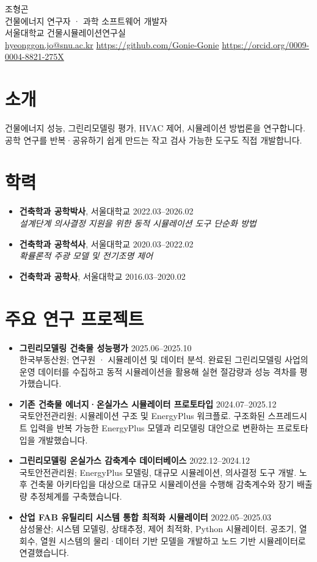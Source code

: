 \documentclass[10pt,a4paper]{article}
\begin{document}
{\LARGE 조형곤}\\[3pt]
건물에너지 연구자 · 과학 소프트웨어 개발자\\
서울대학교 건물시뮬레이션연구실\\
\href{mailto:hyeonggon.jo@snu.ac.kr}{hyeonggon.jo@snu.ac.kr} \quad \url{https://github.com/Gonie-Gonie} \quad \url{https://orcid.org/0009-0004-8821-275X}

\section*{소개}
건물에너지 성능, 그린리모델링 평가, HVAC 제어, 시뮬레이션 방법론을 연구합니다. 공학 연구를 반복·공유하기 쉽게 만드는 작고 검사 가능한 도구도 직접 개발합니다.

\section*{학력}
\begin{itemize}[leftmargin=*,nosep]
\item \textbf{건축학과 공학박사}, 서울대학교 \hfill 2022.03–2026.02\\\emph{설계단계 의사결정 지원을 위한 동적 시뮬레이션 도구 단순화 방법}
\item \textbf{건축학과 공학석사}, 서울대학교 \hfill 2020.03–2022.02\\\emph{확률론적 주광 모델 및 전기조명 제어}
\item \textbf{건축학과 공학사}, 서울대학교 \hfill 2016.03–2020.02
\end{itemize}

\section*{주요 연구 프로젝트}
\begin{itemize}[leftmargin=*]
\item \textbf{그린리모델링 건축물 성능평가} \hfill 2025.06–2025.10\\한국부동산원; 연구원 · 시뮬레이션 및 데이터 분석. 완료된 그린리모델링 사업의 운영 데이터를 수집하고 동적 시뮬레이션을 활용해 실현 절감량과 성능 격차를 평가했습니다.
\item \textbf{기존 건축물 에너지·온실가스 시뮬레이터 프로토타입} \hfill 2024.07–2025.12\\국토안전관리원; 시뮬레이션 구조 및 EnergyPlus 워크플로. 구조화된 스프레드시트 입력을 반복 가능한 EnergyPlus 모델과 리모델링 대안으로 변환하는 프로토타입을 개발했습니다.
\item \textbf{그린리모델링 온실가스 감축계수 데이터베이스} \hfill 2022.12–2024.12\\국토안전관리원; EnergyPlus 모델링, 대규모 시뮬레이션, 의사결정 도구 개발. 노후 건축물 아키타입을 대상으로 대규모 시뮬레이션을 수행해 감축계수와 장기 배출량 추정체계를 구축했습니다.
\item \textbf{산업 FAB 유틸리티 시스템 통합 최적화 시뮬레이터} \hfill 2022.05–2025.03\\삼성물산; 시스템 모델링, 상태추정, 제어 최적화, Python 시뮬레이터. 공조기, 열회수, 열원 시스템의 물리·데이터 기반 모델을 개발하고 노드 기반 시뮬레이터로 연결했습니다.
\end{itemize}
\end{document}
